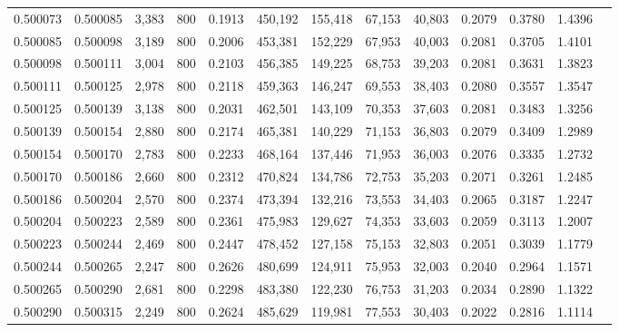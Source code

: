 \begin{tabular}{rrrrrrrrrrrrr}
0.500073 & 0.500085 & 3,383 & 800 &                                     0.1913 & 450,192 & 155,418 &  67,153 &  40,803 & 0.2079 & 0.3780 & 1.4396 \\
0.500085 & 0.500098 & 3,189 & 800 &                                     0.2006 & 453,381 & 152,229 &  67,953 &  40,003 & 0.2081 & 0.3705 & 1.4101 \\
0.500098 & 0.500111 & 3,004 & 800 &                                     0.2103 & 456,385 & 149,225 &  68,753 &  39,203 & 0.2081 & 0.3631 & 1.3823 \\
0.500111 & 0.500125 & 2,978 & 800 &                                     0.2118 & 459,363 & 146,247 &  69,553 &  38,403 & 0.2080 & 0.3557 & 1.3547 \\
0.500125 & 0.500139 & 3,138 & 800 &                                     0.2031 & 462,501 & 143,109 &  70,353 &  37,603 & 0.2081 & 0.3483 & 1.3256 \\
0.500139 & 0.500154 & 2,880 & 800 &                                     0.2174 & 465,381 & 140,229 &  71,153 &  36,803 & 0.2079 & 0.3409 & 1.2989 \\
0.500154 & 0.500170 & 2,783 & 800 &                                     0.2233 & 468,164 & 137,446 &  71,953 &  36,003 & 0.2076 & 0.3335 & 1.2732 \\
0.500170 & 0.500186 & 2,660 & 800 &                                     0.2312 & 470,824 & 134,786 &  72,753 &  35,203 & 0.2071 & 0.3261 & 1.2485 \\
0.500186 & 0.500204 & 2,570 & 800 &                                     0.2374 & 473,394 & 132,216 &  73,553 &  34,403 & 0.2065 & 0.3187 & 1.2247 \\
0.500204 & 0.500223 & 2,589 & 800 &                                     0.2361 & 475,983 & 129,627 &  74,353 &  33,603 & 0.2059 & 0.3113 & 1.2007 \\
0.500223 & 0.500244 & 2,469 & 800 &                                     0.2447 & 478,452 & 127,158 &  75,153 &  32,803 & 0.2051 & 0.3039 & 1.1779 \\
0.500244 & 0.500265 & 2,247 & 800 &                                     0.2626 & 480,699 & 124,911 &  75,953 &  32,003 & 0.2040 & 0.2964 & 1.1571 \\
0.500265 & 0.500290 & 2,681 & 800 &                                     0.2298 & 483,380 & 122,230 &  76,753 &  31,203 & 0.2034 & 0.2890 & 1.1322 \\
0.500290 & 0.500315 & 2,249 & 800 &                                     0.2624 & 485,629 & 119,981 &  77,553 &  30,403 & 0.2022 & 0.2816 & 1.1114 \\

\end{tabular}
